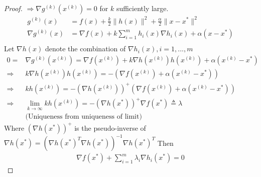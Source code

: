 \documentclass[11pt,a4paper]{article}
\begin{document}
\begin{proof}
    $\Rightarrow \nabla g^{(k)}(x^{(k)})=0$ for $k$ sufficiently large.
    \begin{equation}
        \begin{aligned}
            g^{(k)}(x)&=f(x)+\frac{k}{2}\|h(x)\|^2+\frac{\alpha}{2}\|x-x^*\|^2\\
            \nabla g^{(k)}(x)&=\nabla f(x)+k\sum_{i=1}^m h_i(x) \nabla h_i(x)+\alpha(x-x^*)\\
        \end{aligned}
        \nonumber
    \end{equation}
    Let $\nabla h(x)$ denote the combination of $\nabla h_i(x),i=1,...,m$
    \begin{equation}
        \begin{aligned}
            0=&\nabla g^{(k)}(x^{(k)})=\nabla f(x^{(k)})+k\nabla h(x^{(k)})h(x^{(k)})+\alpha(x^{(k)}-x^*)\\
            \Rightarrow	&k\nabla h(x^{(k)})h(x^{(k)})=-(\nabla f(x^{(k)})+\alpha(x^{(k)}-x^*))\\
            \Rightarrow	&kh(x^{(k)})=-\left(\nabla h(x^{(k)})\right)^+(\nabla f(x^{(k)})+\alpha(x^{(k)}-x^*))\\
            \Rightarrow	&\lim_{k \rightarrow \infty}kh(x^{(k)})=-\left(\nabla h(x^{*})\right)^+\nabla f(x^{*})\triangleq \lambda\\
            &\text{(Uniqueness from uniqueness of limit)}
        \end{aligned}
        \nonumber
    \end{equation}
    Where $\left(\nabla h(x^{*})\right)^+$ is the pseudo-inverse of $\nabla h(x^{*})=(\nabla h(x^{*})^T\nabla h(x^{*}))^{-1}\nabla h(x^{*})^T$
    Then
    \begin{equation}
        \begin{aligned}
            \nabla f(x^*)+\sum_{i=1}^m\lambda_i \nabla h_i(x^*)=0
        \end{aligned}
        \nonumber
    \end{equation}
\end{proof}
\end{document}
